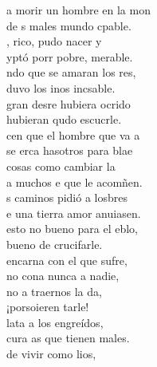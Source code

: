 \documentclass[12pt]{article}
\begin{document}
\begin{multicols*}{2}
\begin{cancion}%
	 a morir un hombre en la mon\\
	de s males  mundo cpable. \\
	, rico, pudo nacer y \\
	yptó porr pobre, merable.\\
	ndo que se amaran los res,\\
	duvo los inos incsable.\\
	gran desre hubiera ocrido\\
	 hubieran qudo escucrle.\\
\jump
	cen que el hombre que va a \\
	se erca hasotros para blae\\
	 cosas como cambiar la \\
	a muchos e que le acomñen.\\
	s caminos pidió a losbres\\
	e una tierra amor anuiasen.\\
	 esto no bueno para el eblo,\\
	 bueno de crucifarle.\\
\jump
	 encarna con el que sufre,\\
	no cona nunca a nadie,\\
	no a traernos la da,\\
	¡porsoieren tarle!\\
\jump
	lata a los engreídos,\\
	cura as que tienen males.\\
	de vivir como lios,\\

\end{cancion}
\end{multicols*}
\end{document}

